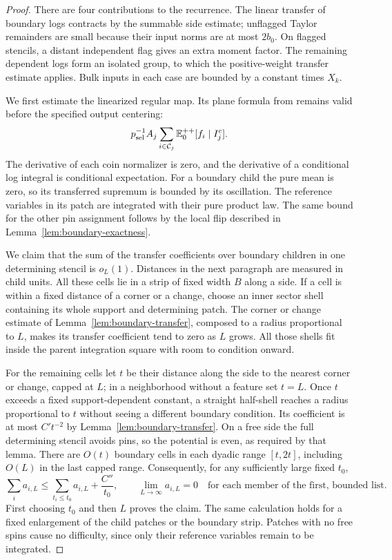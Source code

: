\begin{proof}
There are four contributions to the recurrence.  The linear transfer
of boundary logs contracts by the summable side estimate; unflagged
Taylor remainders are small because their input norms are at most
$2b_0$.  On flagged stencils, a distant independent flag gives an
extra moment factor.  The remaining dependent logs form an isolated
group, to which the positive-weight transfer estimate applies.
Bulk inputs in each case are bounded by a constant times $X_k$.

We first estimate the linearized regular map.  Its plane formula from
\cite[Lemma~3.2, \emph{Regular linearization}]{Q} remains valid before the
specified output centering:
\[
 p_{\rm sel}^{-1}A_j\sum_{i\in\mathcal C_j}
          \mathbb E_0^{++}[f_i\mid I_j^c].
\]
The derivative of each coin normalizer is zero, and the derivative of
a conditional log integral is conditional expectation.  For a
boundary child the pure mean is zero, so its transferred supremum is
bounded by its oscillation.  The reference variables in its patch are
integrated with their pure product law.  The same bound for the other
pin assignment follows by the local flip described in
Lemma~\ref{lem:boundary-exactness}.

We claim that the sum of the transfer coefficients over boundary
children in one determining stencil is $o_L(1)$.  Distances in the next
paragraph are measured in child units.  All these cells lie in a strip
of fixed width $B$ along a side.  If a cell is within a fixed distance
of a corner or a change, choose an inner sector shell containing its
whole support and determining patch.  The corner or change estimate
of Lemma~\ref{lem:boundary-transfer}, composed to a radius proportional
to $L$, makes its transfer coefficient tend to zero as $L$ grows.
All those shells fit inside the parent integration square with room
to condition onward.

For the remaining cells let $t$ be their distance along the side to
the nearest corner or change, capped at $L$; in a neighborhood without
a feature set $t=L$.  Once $t$ exceeds a fixed support-dependent
constant, a straight half-shell reaches a radius proportional to $t$
without seeing a different boundary condition.  Its coefficient is
at most $C't^{-2}$ by Lemma~\ref{lem:boundary-transfer}.  On a free side
the full determining stencil avoids pins, so the potential is even,
as required by that lemma.  There are $O(t)$ boundary cells in each
dyadic range $[t,2t]$, including $O(L)$ in the last capped range.
Consequently, for any sufficiently large fixed $t_0$,
\begin{equation}\label{eq:boundary-summable-transfer}
 \sum_i a_{i,L}
 \le \sum_{t_i\le t_0}a_{i,L}+\frac{C''}{t_0},
 \qquad
 \lim_{L\to\infty}a_{i,L}=0
       \quad\text{for each member of the first, bounded list}.
\end{equation}
First choosing $t_0$ and then $L$ proves the claim.  The same calculation
holds for a fixed enlargement of the child patches or the boundary
strip.  Patches with no free spins cause no difficulty, since only
their reference variables remain to be integrated.


\end{proof}
